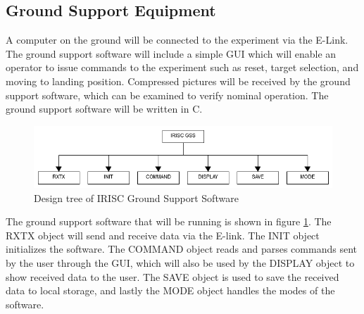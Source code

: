 \pagebreak
\subsection{Ground Support Equipment}\label{sec:4.9}
A computer on the ground will be connected to the experiment via the E-Link. The ground support software will include a simple GUI which will enable an operator to issue commands to the experiment such as reset, target selection, and moving to landing position. Compressed pictures will be received by the ground support software, which can be examined to verify nominal operation. The ground support software will be written in C.

\begin{figure}[h]
	\centering
	\includegraphics[width=\textwidth]{4-experiment-design/img/software/GSS-tree.png}
	\caption{Design tree of IRISC Ground Support Software}
	\label{fig:gss-tree}
\end{figure}

The ground support software that will be running is shown in figure \ref{fig:gss-tree}. The RXTX object will send and receive data via the E-link. The INIT object initializes the software. The COMMAND object reads and parses commands sent by the user through the GUI, which will also be used by the DISPLAY object to show received data to the user. The SAVE object is used to save the received data to local storage, and lastly the MODE object handles the modes of the software.
\raggedbottom
